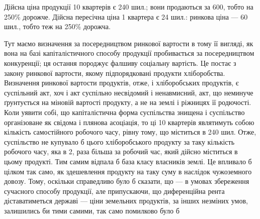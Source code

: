 Дійсна ціна продукції 10 квартерів є 240 шил.; вони продаються за 600, тобто на 250\% дорожче.
Дійсна пересічна ціна 1 квартера є 24 шил.: ринкова ціна — 60 шил., тобто теж на 250\% дорожча.

Тут маємо визначення за посередництвом ринкової вартости в тому її вигляді, як вона на базі
капіталістичного способу продукції пробивається за посередництвом конкуренції; ця остання породжує
фалшиву соціальну вартість. Це постає з закону ринкової вартости, якому підпорядковані продукти
хліборобства.
Визначення ринкової вартости продуктів, отже, і хліборобських продуктів, є суспільний акт, хоч і акт
суспільно несвідомий і ненавмисний, акт, що неминуче ґрунтується на міновій вартості продукту, а не
на землі і ріжницях її родючості. Коли уявити собі, що капіталістична форма суспільства знищена і
суспільство організоване як свідома і плянова асоціація, то ці 10 квартерів являтимуть собою
кількість самостійного робочого часу, рівну тому, що міститься в 240 шил. Отже, суспільство не
купувало б цього хліборобського продукту за таку кількість робочого часу, яка в 2, раза більша
за робочий час, який дійсно міститься в цьому продукті. Тим самим відпала б база класу власників
землі. Це впливало б цілком так само, як здешевлення продукту на таку суму в наслідок чужоземного
довозу. Тому, оскільки справедливо було б сказати, що — в умовах збереження сучасного способу
продукції, але припускаючи, що диференційна рента діставатиметься державі — ціни земельних
продуктів, за інших незміних умов, залишились би тими самими, так само помилково було б

\parbreak{}  %
